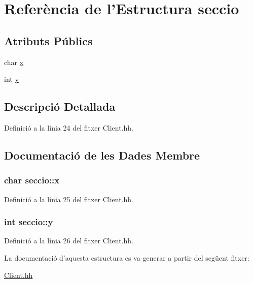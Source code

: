 \hypertarget{structseccio}{\section{Referència de l'Estructura seccio}
\label{structseccio}
}
\subsection*{Atributs Públics}
\begin{DoxyCompactItemize}
\item 
char \hyperlink{structseccio_a79b7cd781dda5569b4b4badb512fc11c}{x}
\item 
int \hyperlink{structseccio_a64750c70c27eab01bdcf2716ca74181f}{y}
\end{DoxyCompactItemize}


\subsection{Descripció Detallada}


Definició a la línia 24 del fitxer Client.\-hh.



\subsection{Documentació de les Dades Membre}
\hypertarget{structseccio_a79b7cd781dda5569b4b4badb512fc11c}{
\subsubsection[{x}]{\setlength{\rightskip}{0pt plus 5cm}char seccio\-::x}}\label{structseccio_a79b7cd781dda5569b4b4badb512fc11c}


Definició a la línia 25 del fitxer Client.\-hh.

\hypertarget{structseccio_a64750c70c27eab01bdcf2716ca74181f}{
\subsubsection[{y}]{\setlength{\rightskip}{0pt plus 5cm}int seccio\-::y}}\label{structseccio_a64750c70c27eab01bdcf2716ca74181f}


Definició a la línia 26 del fitxer Client.\-hh.



La documentació d'aquesta estructura es va generar a partir del següent fitxer\-:\begin{DoxyCompactItemize}
\item 
\hyperlink{_client_8hh}{Client.\-hh}\end{DoxyCompactItemize}
